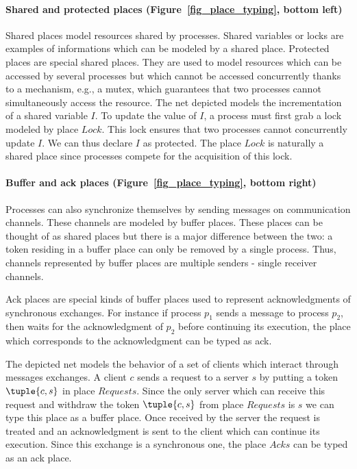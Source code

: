 \paragraph{Shared and protected places (Figure~\ref{fig_place_typing}, bottom left)}
Shared places model resources shared by processes. Shared variables or
locks are examples of informations which can be modeled by a shared
place. Protected places are special shared places. They are used to
model resources which can be accessed by several processes but which
cannot be accessed concurrently thanks to a mechanism, e.g., a mutex,
which guarantees that two processes cannot simultaneously access the
resource.  The net depicted models the incrementation of a shared
variable $I$. To update the value of $I$, a process must first grab a
lock modeled by place $Lock$. This lock ensures that two processes
cannot concurrently update $I$. We can thus declare $I$ as
protected. The place $Lock$ is naturally a shared place since
processes compete for the acquisition of this lock.

\paragraph{Buffer and ack places (Figure~\ref{fig_place_typing}, bottom right)}
Processes can also synchronize themselves by sending messages on
communication channels. These channels are modeled by buffer
places. These places can be thought of as shared places but there is a
major difference between the two: a token residing in a buffer place
can only be removed by a single process. Thus, channels represented by
buffer places are multiple senders - single receiver channels.

Ack places are special kinds of buffer places used to represent
acknowledgments of synchronous exchanges. For instance if process
$p_1$ sends a message to process $p_2$, then waits for the
acknowledgment of $p_2$ before continuing its execution, the place
which corresponds to the acknowledgment can be typed as ack.

The depicted net models the behavior of a set of clients which
interact through messages exchanges. A client $c$ sends a request to a
server $s$ by putting a token $\tuple{c,s}$ in place $Requests$. Since
the only server which can receive this request and withdraw the token
$\tuple{c,s}$ from place $Requests$ is $s$ we can type this place as a
buffer place. Once received by the server the request is treated and
an acknowledgment is sent to the client which can continue its
execution. Since this exchange is a synchronous one, the place $Acks$
can be typed as an ack place.

